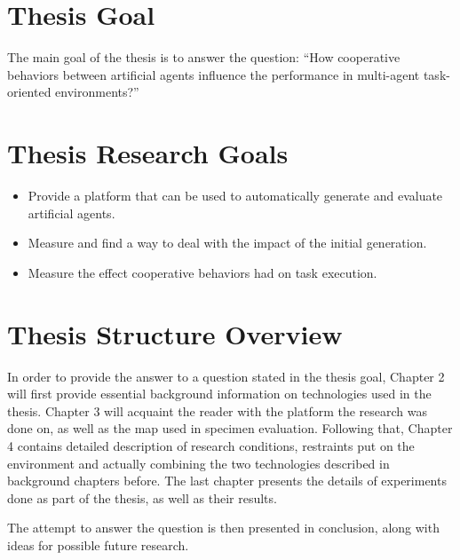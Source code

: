 \section{Thesis Goal}
The main goal of the thesis is to answer the question:
``How cooperative behaviors between artificial agents influence the performance in multi-agent task-oriented environments?''
\section{Thesis Research Goals}
\begin{itemize}
    \item Provide a platform that can be used to automatically generate and evaluate artificial agents.
    \item Measure and find a way to deal with the impact of the initial generation.   \item Measure the effect cooperative behaviors had on task execution.
\end{itemize}
\section{Thesis Structure Overview}
In order to provide the answer to a question stated in the thesis goal, Chapter 2 will first provide essential background information on technologies used in the thesis. Chapter 3 will acquaint the reader with the platform the research was done on, as well as the map used in specimen evaluation. Following that, Chapter 4 contains detailed description of research conditions, restraints put on the environment and actually combining the two technologies described in background chapters before. The last chapter presents the details of experiments done as part of the thesis, as well as their results.

The attempt to answer the question is then presented in conclusion, along with ideas for possible future research.
